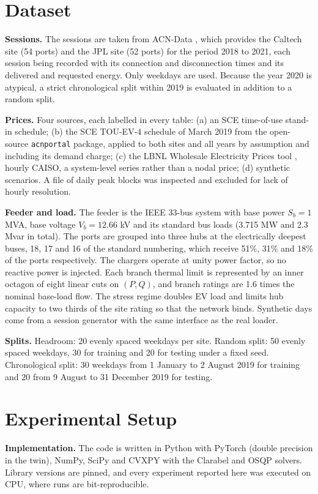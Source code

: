 \documentclass[11pt]{article}
\begin{document}
\section{Dataset}\label{sec:data}
\textbf{Sessions.} The sessions are taken from ACN-Data \cite{acn}, which provides the Caltech site (54 ports) and the JPL site (52 ports) for the period 2018 to 2021, each session being recorded with its connection and disconnection times and its delivered and requested energy. Only weekdays are used. Because the year 2020 is atypical, a strict chronological split within 2019 is evaluated in addition to a random split.

\textbf{Prices.} Four sources, each labelled in every table: (a) an SCE time-of-use stand-in schedule; (b) the SCE TOU-EV-4 schedule of March 2019 from the open-source \texttt{acnportal} package, applied to both sites and all years by assumption and including its demand charge; (c) the LBNL Wholesale Electricity Prices tool \cite{wep}, hourly CAISO, a system-level series rather than a nodal price; (d) synthetic scenarios. A file of daily peak blocks was inspected and excluded for lack of hourly resolution.

\textbf{Feeder and load.} The feeder is the IEEE 33-bus system \cite{baranwu} with base power $S_b=1$ MVA, base voltage $V_b=12.66$ kV and its standard bus loads (3.715 MW and 2.3 Mvar in total). The ports are grouped into three hubs at the electrically deepest buses, 18, 17 and 16 of the standard numbering, which receive 51\%, 31\% and 18\% of the ports respectively. The chargers operate at unity power factor, so no reactive power is injected. Each branch thermal limit is represented by an inner octagon of eight linear cuts on $(P,Q)$, and branch ratings are 1.6 times the nominal base-load flow. The stress regime doubles EV load and limits hub capacity to two thirds of the site rating so that the network binds. Synthetic days come from a session generator with the same interface as the real loader.

\textbf{Splits.} Headroom: 20 evenly spaced weekdays per site. Random split: 50 evenly spaced weekdays, 30 for training and 20 for testing under a fixed seed. Chronological split: 30 weekdays from 1 January to 2 August 2019 for training and 20 from 9 August to 31 December 2019 for testing.

\section{Experimental Setup}\label{sec:setup}
\textbf{Implementation.} The code is written in Python with PyTorch (double precision in the twin), NumPy, SciPy and CVXPY with the Clarabel and OSQP solvers. Library versions are pinned, and every experiment reported here was executed on CPU, where runs are bit-reproducible.
\end{document}
